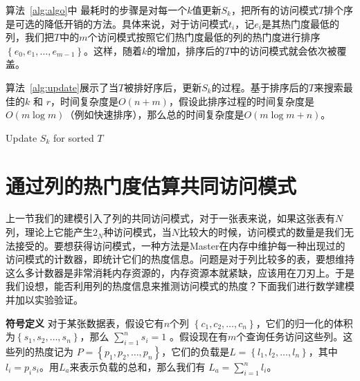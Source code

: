 \par 算法~\ref{alg:algo}中 最耗时的步骤是对每一个$k$值更新$S_k$，把所有的访问模式$T$排个序是可选的降低开销的方法。具体来说，对于访问模式$t_i$，记$e_i$是其热门度最低的列，我们把$T$中的$m$个访问模式按照它们热门度最低的列的热门度进行排序$\left\{e_{0}, e_{1}, \dots, e_{m-1}\right\}$。这样，随着$k$的增加，排序后的$T$中的访问模式就会依次被覆盖。

\par 算法~\ref{alg:update}展示了当$T$被排好序后，更新$S_k$的过程。基于排序后的$T$来搜索最佳的$k$ 和 $r$，时间复杂度是$O(n + m)$，假设此排序过程的时间复杂度是$O(m\log{m})$（例如快速排序），那么总的时间复杂度是$O(m\log{m} + n)$。

\begin{algorithm}[tb]
	\caption{Update $S_k$ for sorted $T$}
	\label{alg:update}
	\small
	\begin{algorithmic}[1]
		\Else
		\State{\Return}
		\EndIf
		\EndFor
		\EndFunction
		
	\end{algorithmic}
\end{algorithm}

\section{通过列的热门度估算共同访问模式}
\label{sec:estimate-patern}
\par 上一节我们的建模引入了列的共同访问模式，对于一张表来说，如果这张表有$N$列，理论上它能产生$2_N$种访问模式，当$N$比较大的时候，访问模式的数量是我们无法接受的。要想获得访问模式，一种方法是Master在内存中维护每一种出现过的访问模式的计数器，即统计它们的热度信息。问题是对于列比较多的表，要想维持这么多计数器是非常消耗内存资源的，内存资源本就紧缺，应该用在刀刃上。于是我们设想，能否利用列的热度信息来推测访问模式的热度？下面我们进行数学建模并加以实验验证。

\par \noindent \textbf{符号定义} 对于某张数据表，假设它有$n$个列 $\left\{ c_{1}, c_{2}, \dots ,c_{n} \right\} $，它们的归一化的体积为$\left\{ s_{1}, s_{2}, \dots ,s_{n} \right\} $，那么 $\sum_{i=1}^{n}s_i = 1$ 。假设现在有$m$个查询任务访问这些列。这些列的热度记为 $ P = \left\{ p_{1}, p_{2}, \dots, p_{n} \right\} $，它们的负载是$ L = \left\{ l_{1}, l_{2}, \dots, l_{n} \right\} $，其中 $l_i = p_i s_i$。用$L_a$来表示负载的总和，那么我们有 $L_a = \sum_{i=1}^{n}l_i$。

